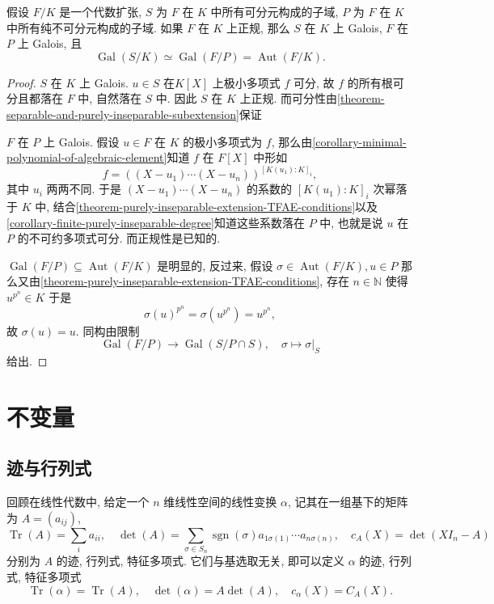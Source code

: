 \begin{corollary}
  假设 \( F/K \) 是一个代数扩张, \( S \) 为 \( F \) 在 \( K \)
  中所有可分元构成的子域, \( P \) 为 \( F \) 在 \( K \)
  中所有纯不可分元构成的子域.
  如果 \( F \) 在 \( K \) 上正规, 那么 \( S \) 在 \( K \) 上 Galois, \( F \) 在
  \( P \) 上 Galois, 且
  \[
    \operatorname{Gal}(S/K) \simeq \operatorname{Gal}(F/P) =
    \operatorname{Aut}(F/K).
  \]
\end{corollary}
\begin{proof}
  \( S \) 在 \( K \) 上 Galois.
  \( u \in S \) 在\( K[X] \) 上极小多项式 \( f \) 可分, 故 \( f \)
  的所有根可分且都落在 \( F \) 中, 自然落在 \( S \) 中. 因此 \( S \) 在 \( K \)
  上正规.
  而可分性由\cref{theorem-separable-and-purely-inseparable-subextension}保证

  \( F \) 在 \( P \) 上 Galois.
  假设 \( u \in F \) 在 \( K \) 的极小多项式为 \( f \),
  那么由\cref{corollary-minimal-polynomial-of-algebraic-element}知道 \( f \)
  在 \( F[X] \) 中形如
  \[
    f = ((X - u_1)\cdots (X - u_n))^{[K(u_1):K]_i},
  \]
  其中 \( u_i \) 两两不同.
  于是 \( (X - u_1) \cdots (X - u_n) \) 的系数的 \( [K(u_1): K]_i \) 次幂落于 \(
  K \) 中,
  结合\cref{theorem-purely-inseparable-extension-TFAE-conditions}以及\cref{corollary-finite-purely-inseparable-degree}知道这些系数落在
  \( P \) 中, 也就是说 \( u \) 在 \( P \) 的不可约多项式可分.
  而正规性是已知的.

  \( \operatorname{Gal}(F/P) \subseteq \operatorname{Aut}(F/K) \) 是明显的,
  反过来, 假设 \( \sigma \in \operatorname{Aut}(F/K), u \in P \)
  那么又由\cref{theorem-purely-inseparable-extension-TFAE-conditions}, 存在 \( n
  \in \mathbb{N} \) 使得 \( u^{p^n} \in K \) 于是
  \[
    \sigma(u)^{p^n} = \sigma(u^{p^n}) = u^{p^n},
  \]
  故 \( \sigma(u) = u \).
  同构由限制
  \[
    \operatorname{Gal}(F/P) \to \operatorname{Gal}(S/P \cap S),\quad \sigma
    \mapsto \left. \sigma \right\vert_{S}
  \]
  给出.
\end{proof}

\section{不变量}

\subsection{迹与行列式}

回顾在线性代数中, 给定一个 \( n \) 维线性空间的线性变换 \( \alpha \),
记其在一组基下的矩阵为 \( A = (a_{ij}) \),
\[
  \operatorname{Tr}(A) = \sum_i a_{ii},\quad
  \det (A) = \sum_{\sigma \in S_n}\operatorname{sgn}(\sigma)a_{1\sigma(1)}\cdots
  a_{n \sigma(n)},\quad
  c_A(X) = \det(XI_n - A)
\]
分别为 \( A \) 的迹, 行列式, 特征多项式.
它们与基选取无关, 即可以定义 \( \alpha \) 的迹, 行列式, 特征多项式
\[
  \operatorname{Tr}(\alpha) = \operatorname{Tr}(A),\quad
  \det(\alpha) = A\det(A),\quad
  c_{\alpha}(X) = C_A(X).
\]

